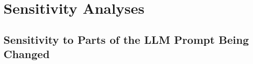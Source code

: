 \documentclass[pdflatex,sn-mathphys-num]{sn-jnl}%
\theoremstyle{thmstyleone}%
\theoremstyle{thmstyletwo}%
\theoremstyle{thmstylethree}%
\begin{document}

\section{Sensitivity Analyses}
\label{apd:sensitivity-analyses}



\subsection{Sensitivity to Parts of the LLM Prompt Being Changed}
\label{apd:sensitivity-llm-prompt}
\end{document}
